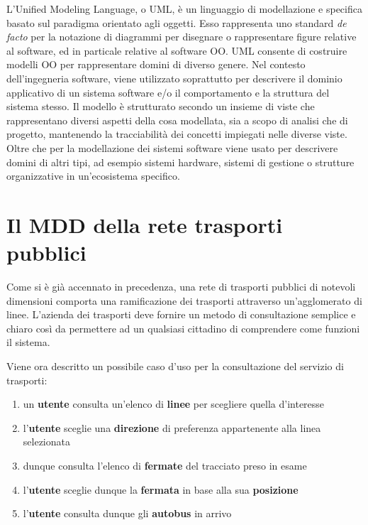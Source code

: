L'Unified Modeling Language, o UML, è un linguaggio di modellazione e specifica basato sul paradigma orientato agli oggetti. Esso rappresenta 
uno standard {\itshape de facto} per la notazione di diagrammi per disegnare o rappresentare figure relative al software, ed in particale relative al software OO.
UML consente di costruire modelli OO per rappresentare domini di diverso genere. Nel contesto dell'ingegneria software, viene utilizzato soprattutto per descrivere il dominio applicativo di un sistema software e/o il comportamento e la struttura del sistema stesso.
Il modello è strutturato secondo un insieme di viste che rappresentano diversi aspetti della cosa modellata, sia a scopo di analisi che di progetto, mantenendo la tracciabilità dei concetti impiegati nelle diverse viste. Oltre che per la modellazione dei sistemi software viene usato per descrivere domini di altri tipi, ad esempio sistemi hardware, sistemi di gestione o strutture organizzative in un'ecosistema specifico. 

\section{Il MDD della rete trasporti pubblici} %
\label{sec:il_MDD_della_rete_trasporti_pubblici}

Come si è già accennato in precedenza, una rete di trasporti pubblici di notevoli dimensioni comporta una ramificazione dei trasporti attraverso un'agglomerato di linee. L'azienda dei trasporti deve fornire un metodo di consultazione semplice e chiaro così da permettere ad un qualsiasi cittadino di comprendere come funzioni il sistema.

Viene ora descritto un possibile caso d'uso per la consultazione del servizio di trasporti:

\begin{enumerate}
   \item un {\bfseries utente} consulta un'elenco di {\bfseries linee} per scegliere quella d'interesse
   \item l'{\bfseries utente} sceglie una {\bfseries direzione} di preferenza appartenente alla linea selezionata
   \item dunque consulta l'elenco di {\bfseries fermate} del tracciato preso in esame
   \item l'{\bfseries utente} sceglie dunque la {\bfseries fermata} in base alla sua {\bfseries posizione}
   \item l'{\bfseries utente} consulta dunque gli {\bfseries autobus} in arrivo
\end{enumerate}

